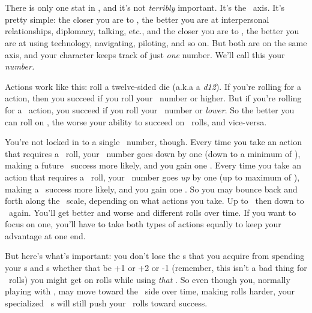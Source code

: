 \section{\feelingsvslasers}
\par
There is only one stat in \getTitleShort, and it's not \textit{terribly} important. It's the \feelingsvslasers\, axis. It's pretty simple: the closer you are to \feelings, the better you are at interpersonal relationships, diplomacy, talking, etc., and the closer you are to \lasers, the better you are at using technology, navigating, piloting, and so on. But both are on the same axis, and your character keeps track of just \textit{one} number. We'll call this your \textit{\both\, number.}

\par
Actions work like this: roll a twelve-sided die (a.k.a a \textit{d12}). If you're rolling for a \lasers\, action, then you succeed if you roll your \both\, number or higher. But if you're rolling for a \feelings\, action, you succeed if you roll your \both\, number or \textit{lower}. So the better you can roll on \lasers, the worse your ability to succeed on \feelings\, rolls, and vice-versa.

\par
You're not locked in to a single \both\, number, though. Every time you take an action that requires a \lasers\, roll, your \both\, number goes down by one (down to a minimum of \lowerlimit), making a future \lasers\, success more likely, and you gain one \lasersxp. Every time you take an action that requires a \feelings\, roll, your \both\, number goes \textit{up} by one (up to maximum of \upperlimit), making a \feelings\, success more likely, and you gain one \feelingsxp. So you may bounce back and forth along the \feelingsvslasers\, scale, depending on what actions you take. Up to \upperlimit\, then down to \lowerlimit\, again. You'll get better and worse and different rolls over time.  If you want to focus on one, you'll have to take both types of actions equally to keep your advantage at one end.

\par
But here's what's important: you don't lose the \modifier s that you acquire from spending your \lasersxp s and \feelingsxp s whether that be +1 or +2 or -1 (remember, this isn't a bad thing for \lasers\, rolls) you might get on rolls while using \textit{that} \skill . So even though you, normally playing with \lasers , may move toward the \feelings\, side over time, making rolls harder, your specialized \lasers\, \skill s will still push your \lasers\, rolls toward success.

